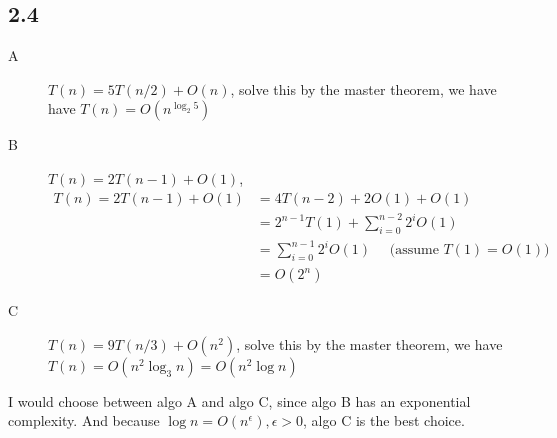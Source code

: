 \documentclass[twoside]{homework}
\begin{document}
\subsection*{2.4}
\begin{description}
	\item[A] $T(n) = 5T(n/2) + O(n)$, solve this by the master theorem, we have have $T(n) = O(n^{\log_2 5})$
	\item[B] $T(n) = 2T(n-1) + O(1)$,
		\begin{align*}
			T(n) = 2T(n-1) + O(1) &= 4T(n-2) + 2O(1) + O(1) \\
			&= 2^{n-1}T(1) + \sum_{i=0}^{n-2} 2^iO(1) \\
			&= \sum_{i=0}^{n-1} 2^iO(1) \quad \text{ (assume $T(1) = O(1)$)} \\
			&= O(2^n)
		\end{align*}
	\item[C] $T(n) = 9T(n/3) + O(n^2)$, solve this by the master theorem, we have $T(n) = O(n^2\log_3 n) = O(n^2\log n)$
\end{description}
I would choose between algo A and algo C, since algo B has an exponential complexity. And because $\log n = O(n^{\epsilon}), \epsilon > 0$, algo C is the best choice.
\end{document}
